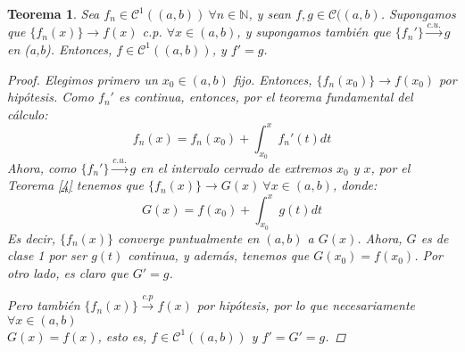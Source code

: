 \documentclass[11pt, a4paper]{article}
\theoremstyle{theorem-style}
\newtheorem{nth}{Teorema}[section]
\theoremstyle{definition-style}
\theoremstyle{remark-style}
\theoremstyle{example-style}
\begin{document}
\begin{nth} \label{5}
	Sea $f_n\in \mathcal{C}^1((a,b)) \ \forall n \in \mathbb{N}$, y sean $f,g \in \mathcal{C}((a,b)$. Supongamos que $ \{f_n(x)\} \to f(x)$ c.p. $\forall x \in (a,b)$, y supongamos también que $\{f_n'\} \xrightarrow{c.u.} g $ en (a,b). Entonces, $f \in \mathcal{C}^1((a,b))$, y $f' = g$.
	
\begin{proof}
	Elegimos primero un $x_0 \in (a,b)$ fijo. Entonces, $\{f_n(x_0)\} \to f(x_0)$ por hipótesis.
	Como $f_n'$ es continua, entonces, por el teorema fundamental del cálculo:
	\[
	f_n(x) = f_n(x_0) + \int_{x_0}^x f_n'(t)dt
	\]
	Ahora, como  $\{f_n'\} \xrightarrow{c.u.} g $ en el intervalo cerrado de extremos $x_0$ y $x$, por el \textit{Teorema \ref{4}} tenemos que $\{f_n(x)\} \to G(x)\ \forall x \in (a,b)$, donde:
	\[
	    G(x) = f(x_0) + \int_{x_0}^x g(t)dt
	\]
	Es decir, $\{f_n(x)\}$ converge puntualmente en $(a,b)$ a $G(x)$. Ahora, $G$ es de clase 1 por ser $g(t)$ continua, y además, tenemos que $G(x_0) = f(x_0)$.
	Por otro lado, es claro que $G' = g$.
	
	Pero también $\{f_n(x)\} \xrightarrow {c.p} f(x)$ por hipótesis, por lo que necesariamente $\forall x \in (a,b)$ \\ $G(x) = f(x)$, esto es, $f \in \mathcal{C}^1((a,b))$ y $f' = G' = g$.
\end{proof}
\end{nth}
\end{document}
